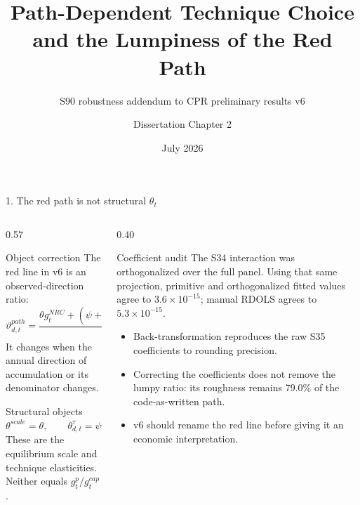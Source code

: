 \documentclass[10pt,aspectratio=169]{beamer}
\title[Path-dependent technique choice]{Path-Dependent Technique Choice and the Lumpiness of the Red Path}
\subtitle{S90 robustness addendum to CPR preliminary results v6}
\author{Dissertation Chapter 2}
\date{July 2026}
\begin{document}
\begin{frame}{1. The red path is not structural $\theta_t$}
  \begin{columns}[T,onlytextwidth]
    \begin{column}{0.57\textwidth}
      \begin{alertblock}{Object correction}
        The red line in v6 is an observed-direction ratio:
        \[
          \vartheta^{path}_{d,t}
          =\frac{\theta g_t^{NRC}+
          (\psi+\lambda\widetilde d_t)(g_t^{ME}-g_t^{NRC})}
          {g_t^{cap}}.
        \]
        It changes when the annual direction of accumulation or its denominator changes.
      \end{alertblock}
      \begin{block}{Structural objects}
        \vspace{-0.7em}
        \[
          \theta^{scale}=\theta,
          \qquad
          \theta^{\tau}_{d,t}=\psi+\lambda\widetilde d_t.
        \]
        These are the equilibrium scale and technique elasticities. Neither equals
        $g_t^p/g_t^{cap}$.
      \end{block}
    \end{column}
    \begin{column}{0.40\textwidth}
      \begin{block}{Coefficient audit}
        \small
        The S34 interaction was orthogonalized over the full panel. Using that same
        projection, primitive and orthogonalized fitted values agree to
        $3.6\times10^{-15}$; manual RDOLS agrees to $5.3\times10^{-15}$.
      \end{block}
      \begin{itemize}\small
        \item Back-transformation reproduces the raw S35 coefficients to rounding precision.
        \item Correcting the coefficients does not remove the lumpy ratio: its roughness remains 79.0\% of the code-as-written path.
        \item v6 should rename the red line before giving it an economic interpretation.
      \end{itemize}
    \end{column}
  \end{columns}
\end{frame}
\end{document}
